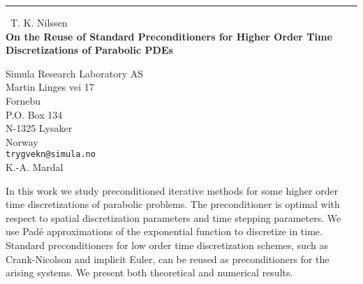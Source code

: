 \documentclass{report}
\begin{document}
\begin{center}
\rule{6in}{1pt} \
{\large T. K. Nilssen \\
{\bf On the Reuse of Standard Preconditioners for Higher Order Time Discretizations of Parabolic PDEs}}

Simula Research Laboratory AS \\ Martin Linges vei 17 \\ Fornebu \\ P.O. Box 134 \\ N-1325 Lysaker \\ Norway
\\
{\tt trygvekn@simula.no}\\
K.-A. Mardal\end{center}

In this work we study preconditioned iterative methods for some higher
order time discretizations of parabolic problems.
The preconditioner is optimal with respect to spatial
discretization parameters and time stepping parameters.
We use Pad\'{e} approximations of the exponential function to
discretize in time. Standard preconditioners for low order
time discretization schemes, such as Crank-Nicolson and implicit Euler,
can be reused as preconditioners for the arising systems. We present both
theoretical and numerical results.
\end{document}
